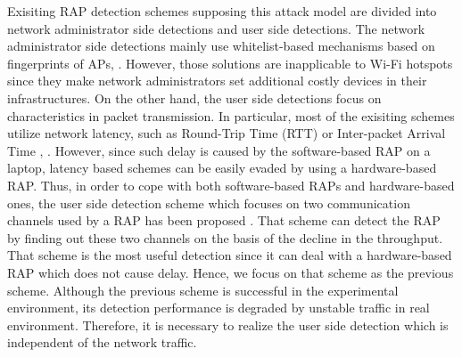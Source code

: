 \documentclass[conference]{IEEEtran}
\begin{document}
Exisiting RAP detection schemes supposing this attack model are divided into network administrator side detections and user side detections.
The network administrator side detections mainly use whitelist-based mechanisms based on fingerprints of APs\cite{prapd}, \cite{clockskew}.
However, those solutions are inapplicable to Wi-Fi hotspots since they make network administrators set additional costly devices in their infrastructures.
On the other hand, the user side detections focus on characteristics in packet transmission.
In particular, most of the exisiting schemes utilize network latency, such as Round-Trip Time (RTT) or Inter-packet Arrival Time \cite{rtt}, \cite{iat}.
However, since such delay is caused by the software-based RAP on a laptop, latency based schemes can be easily evaded by using a hardware-based RAP.
Thus, in order to cope with both software-based RAPs and hardware-based ones, the user side detection scheme which focuses on two communication channels used by a RAP has been proposed \cite{previous}.
That scheme can detect the RAP by finding out these two channels on the basis of the decline in the throughput.
That scheme is the most useful detection since it can deal with a hardware-based RAP which does not cause delay.
Hence, we focus on that scheme \cite{previous} as the previous scheme.
Although the previous scheme is successful in the experimental environment, its detection performance is degraded by unstable traffic in real environment.
Therefore, it is necessary to realize the user side detection which is independent of the network traffic.
\end{document}
